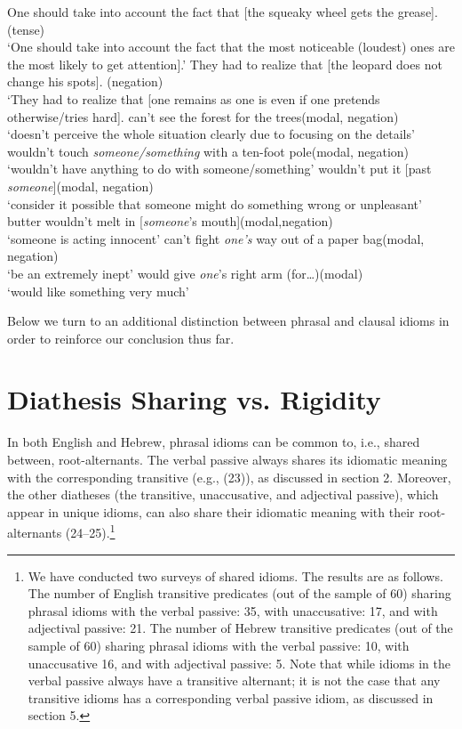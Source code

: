 \documentclass[output=paper,
modfonts
]{LSP/langsci}
\begin{document}
\ea 
	\ea One should take into account the fact that {[}the squeaky wheel
	gets the grease{]}.\hfill (tense)\\
	`One should take into account the fact that the most noticeable
	(loudest) ones are the most likely to get attention{]}.'
	\ex They had to realize that {[}the leopard does not change his spots{]}. (negation)\\
	`They had to realize that {[}one remains as one is even if one pretends
	otherwise/tries hard{]}.
	\z
\ex 
	\ea can't see the forest for the trees\hfill (modal, negation)\\
	 `doesn't perceive the whole situation clearly due to focusing on the details'
	\ex wouldn't touch \emph{someone/something} with a ten-foot pole\hfill (modal,
	negation)\\
	`wouldn't have anything to do with someone/something'
	\z
\ex
	\ea wouldn't put it {[}past \emph{someone}{]}\hfill (modal, negation)\\
	`consider it possible that someone might do something wrong or
	unpleasant'
	\ex butter wouldn't melt in {[}\emph{someone}'s mouth{]}\hfill (modal,negation)\\
	`someone is acting innocent'
	\z
\ex
	\ea can't fight \emph{one's} way out of a paper bag\hfill (modal, negation)\\
	`be an extremely inept'
	\ex would give \emph{one}'s right arm (for\ldots{})\hfill (modal)\\
	`would like something very much'
	\z
\z

Below we turn to an additional distinction between phrasal and clausal
idioms in order to reinforce our conclusion thus far.

\section{Diathesis Sharing vs. Rigidity}

In both English and Hebrew, phrasal idioms can be common to, i.e.,
shared between, root-alternants. The verbal passive always shares its
idiomatic meaning with the corresponding transitive (e.g., (23)), as
discussed in section 2. Moreover, the other diatheses (the transitive,
unaccusative, and adjectival passive), which appear in unique idioms,
can also share their idiomatic meaning with their root-alternants
(24--25).\footnote{We have conducted two surveys of shared idioms. The
  results are as follows. The number of English transitive predicates
  (out of the sample of 60) sharing phrasal idioms with the verbal
  passive: 35, with unaccusative: 17, and with adjectival passive: 21.
  The number of Hebrew transitive predicates (out of the sample of 60)
  sharing phrasal idioms with the verbal passive: 10, with unaccusative
  16, and with adjectival passive: 5. Note that while idioms in the
  verbal passive always have a transitive alternant; it is not the case
  that any transitive idioms has a corresponding verbal passive idiom,
  as discussed in section 5.}
\end{document}
